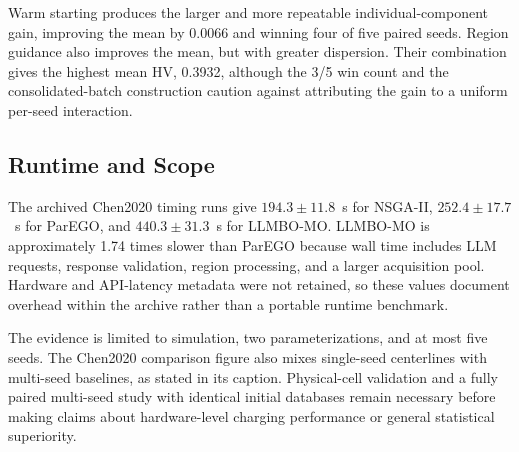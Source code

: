 Warm starting produces the larger and more repeatable individual-component
gain, improving the mean by 0.0066 and winning four of five paired seeds.
Region guidance also improves the mean, but with greater dispersion. Their
combination gives the highest mean HV, 0.3932, although the 3/5 win count and
the consolidated-batch construction caution against attributing the gain to a
uniform per-seed interaction.

\subsection{Runtime and Scope}

The archived Chen2020 timing runs give $194.3\pm11.8$~s for NSGA-II,
$252.4\pm17.7$~s for ParEGO, and $440.3\pm31.3$~s for LLMBO-MO. LLMBO-MO is
approximately 1.74 times slower than ParEGO because wall time includes LLM
requests, response validation, region processing, and a larger acquisition
pool. Hardware and API-latency metadata were not retained, so these values
document overhead within the archive rather than a portable runtime
benchmark.

The evidence is limited to simulation, two parameterizations, and at most
five seeds. The Chen2020 comparison figure also mixes single-seed centerlines
with multi-seed baselines, as stated in its caption. Physical-cell validation
and a fully paired multi-seed study with identical initial databases remain
necessary before making claims about hardware-level charging performance or
general statistical superiority.
